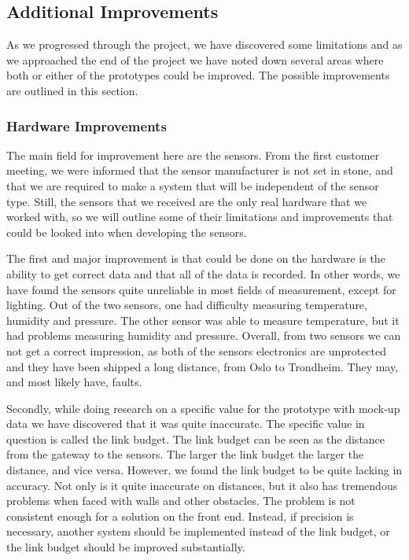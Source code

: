 \documentclass[../document]{subfiles}
\begin{document}
\subsection{Additional Improvements}
As we progressed through the project, we have discovered some limitations and as we approached the end of the project we have noted down several areas where both or either of the prototypes could be improved. The possible improvements are outlined in this section.

\subsubsection{Hardware Improvements}
The main field for improvement here are the sensors. From the first customer meeting, we were informed that the sensor manufacturer is not set in stone, and that we are required to make a system that will be independent of the sensor type. Still, the sensors that we received are the only real hardware that we worked with, so we will outline some of their limitations and improvements that could be looked into when developing the sensors. 

The first and major improvement is that could be done on the hardware is the ability to get correct data and that all of the data is recorded. In other words, we have found the sensors quite unreliable in most fields of measurement, except for lighting. Out of the two sensors, one had difficulty measuring temperature, humidity and pressure. The other sensor was able to measure temperature, but it had problems measuring humidity and pressure. Overall, from two sensors we can not get a correct impression, as both of the sensors electronics are unprotected and they have been shipped a long distance, from Oslo to Trondheim. They may, and most likely have, faults.

Secondly, while doing research on a specific value for the prototype with mock-up data we have discovered that it was quite inaccurate. The specific value in question is called the link budget. The link budget can be seen as the distance from the gateway to the sensors. The larger the link budget the larger the distance, and vice versa. However, we found the link budget to be quite lacking in accuracy. Not only is it quite inaccurate on distances, but it also has tremendous problems when faced with walls and other obstacles. The problem is not consistent enough for a solution on the front end. Instead, if precision is necessary, another system should be implemented instead of the link budget, or the link budget should be improved substantially. 
\end{document}
